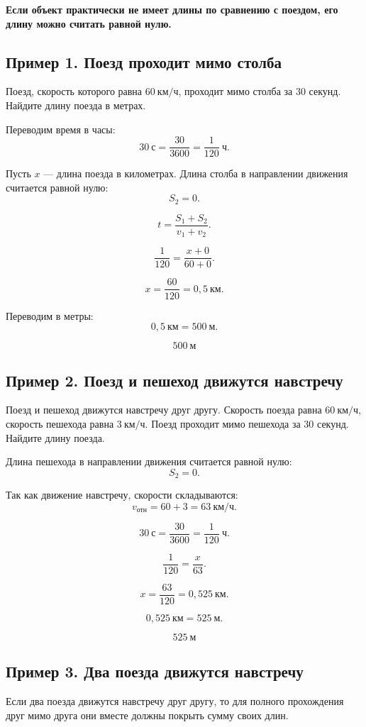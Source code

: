 \documentclass[a4paper,12pt]{article}
\newcommand{\important}[1]{\textcolor{darkaccent}{\textbf{#1}}}
\newcommand{\kmh}{\text{км/ч}}
\newcommand{\km}{\text{км}}
\newcommand{\ch}{\text{ч}}
\newcommand{\ssec}{\text{с}}
\newcommand{\m}{\text{м}}
\begin{document}
\important{Если объект практически не имеет длины по сравнению с поездом, его длину можно считать равной нулю.}

\subsection{Пример 1. Поезд проходит мимо столба}

Поезд, скорость которого равна $60\ \kmh$, проходит мимо столба за $30$ секунд. Найдите длину поезда в метрах.

Переводим время в часы:
\[
30\ \ssec=\frac{30}{3600}=\frac{1}{120}\ \ch.
\]

Пусть $x$ --- длина поезда в километрах. Длина столба в направлении движения считается равной нулю:
\[
S_2=0.
\]

\[
t=\frac{S_1+S_2}{v_1+v_2}.
\]

\[
\frac{1}{120}=\frac{x+0}{60+0}.
\]

\[
x=\frac{60}{120}=0{,}5\ \km.
\]

Переводим в метры:
\[
0{,}5\ \km=500\ \m.
\]

\[
\boxed{500\ \m}
\]

\subsection{Пример 2. Поезд и пешеход движутся навстречу}

Поезд и пешеход движутся навстречу друг другу. Скорость поезда равна $60\ \kmh$, скорость пешехода равна $3\ \kmh$. Поезд проходит мимо пешехода за $30$ секунд. Найдите длину поезда.

Длина пешехода в направлении движения считается равной нулю:
\[
S_2=0.
\]

Так как движение навстречу, скорости складываются:
\[
v_{\text{отн}}=60+3=63\ \kmh.
\]

\[
30\ \ssec=\frac{30}{3600}=\frac{1}{120}\ \ch.
\]

\[
\frac{1}{120}=\frac{x}{63}.
\]

\[
x=\frac{63}{120}=0{,}525\ \km.
\]

\[
0{,}525\ \km=525\ \m.
\]

\[
\boxed{525\ \m}
\]

\subsection{Пример 3. Два поезда движутся навстречу}

Если два поезда движутся навстречу друг другу, то для полного прохождения друг мимо друга они вместе должны покрыть сумму своих длин.
\end{document}
